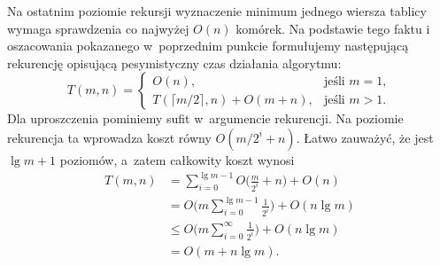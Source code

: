 \subproblem %
Na ostatnim poziomie rekursji wyznaczenie minimum jednego wiersza tablicy wymaga sprawdzenia co najwyżej $O(n)$ komórek. Na podstawie tego faktu i oszacowania pokazanego w~poprzednim punkcie formułujemy następującą rekurencję opisującą pesymistyczny czas działania algorytmu:
\[
	T(m,n) =
	\begin{cases}
		O(n), & \text{jeśli $m=1$}, \\
		T(\lceil m/2\rceil,n)+O(m+n), & \text{jeśli $m>1$}.
	\end{cases}
\]
Dla uproszczenia pominiemy sufit w~argumencie rekurencji. Na  poziomie rekurencja ta wprowadza koszt równy $O(m/2^i+n)$. Łatwo zauważyć, że jest $\lg m+1$ poziomów, a~zatem całkowity koszt wynosi
\begin{align*}
	T(m,n) &= \sum_{i=0}^{\lg m-1}O\biggl(\frac{m}{2^i}+n\biggr)+O(n) \\
	&= O\biggl(m\sum_{i=0}^{\lg m-1}\frac{1}{2^i}\biggr)+O(n\lg m) \\
	&\le O\biggl(m\sum_{i=0}^\infty\frac{1}{2^i}\biggr)+O(n\lg m) \\[1mm]
	&= O(m+n\lg m).
\end{align*}

\endinput
